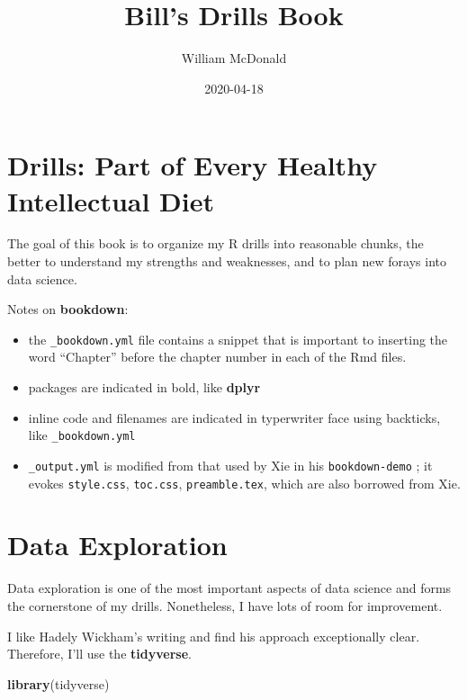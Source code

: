 \documentclass[]{book}
\title{Bill's Drills Book}
\author{William McDonald}
\date{2020-04-18}
\newenvironment{Shaded}{\begin{snugshade}}{\end{snugshade}}
\newcommand{\KeywordTok}[1]{\textcolor[rgb]{0.13,0.29,0.53}{\textbf{#1}}}
\newcommand{\NormalTok}[1]{#1}
\providecommand{\tightlist}{%
  \setlength{\itemsep}{0pt}\setlength{\parskip}{0pt}}
\begin{document}
\maketitle

{
\setcounter{tocdepth}{1}
\tableofcontents
}
\hypertarget{intro}{%
\chapter{Drills: Part of Every Healthy Intellectual Diet}\label{intro}}

The goal of this book is to organize my R drills into reasonable chunks, the better to understand my strengths and weaknesses, and to plan new forays into data science.

Notes on \textbf{bookdown}:

\begin{itemize}
\tightlist
\item
  the \texttt{\_bookdown.yml} file contains a snippet that is important to inserting the word ``Chapter'' before the chapter number in each of the Rmd files.
\item
  packages are indicated in bold, like \textbf{dplyr}
\item
  inline code and filenames are indicated in typerwriter face using backticks, like \texttt{\_bookdown.yml}
\item
  \texttt{\_output.yml} is modified from that used by Xie in his \texttt{bookdown-demo} \citep{R-bookdown}; it evokes \texttt{style.css}, \texttt{toc.css}, \texttt{preamble.tex}, which are also borrowed from Xie.
\end{itemize}

\hypertarget{dataexploration}{%
\chapter{Data Exploration}\label{dataexploration}}

Data exploration is one of the most important aspects of data science and forms the cornerstone of my drills. Nonetheless, I have lots of room for improvement.

I like Hadely Wickham's writing and find his approach exceptionally clear. Therefore, I'll use the \textbf{tidyverse}.

\begin{Shaded}
\begin{Highlighting}[]
\KeywordTok{library}\NormalTok{(tidyverse)}
\end{Highlighting}
\end{Shaded}
\end{document}
